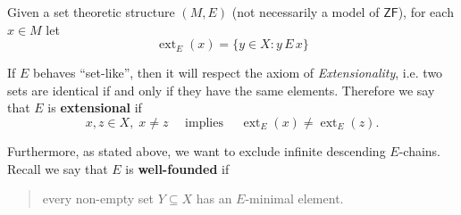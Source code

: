 \documentclass{article}
\newcommand{\ZF}{\mathsf{ZF}}
\newcommand{\Op}[1]{\operatorname{#1}}
\begin{document}
Given a set theoretic structure $(M,E)$ (not necessarily a model of $\ZF$), for each $x \in M$ let
\begin{equation*}
\Op{ext}_E(x) = \{ y \in X \colon y\, E \, x \}
\end{equation*}

If $E$ behaves ``set-like'', then it will respect the axiom of \textit{Extensionality}, i.e. two sets are identical if and only if they have the same elements. Therefore we say that $E$ is \textbf{extensional} if
\begin{equation*}
x,z \in X, \; x\neq z \quad \text{ implies } \quad \Op{ext}_E(x) \neq \Op{ext}_E(z).
\end{equation*}

Furthermore, as stated above, we want to exclude infinite descending $E$-chains. Recall we say that $E$ is \textbf{well-founded} if

\begin{quote}
every non-empty set $Y \subseteq X$ has an $E$-minimal element.
\end{quote}
\end{document}
